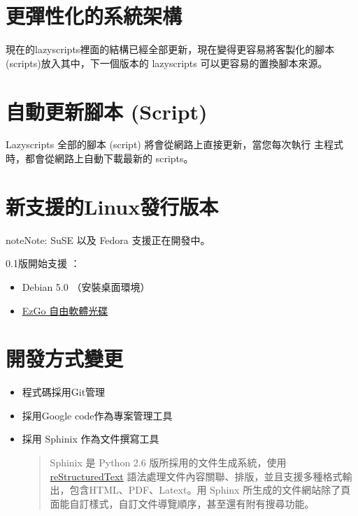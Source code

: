 \documentclass[letterpaper,10pt,english]{manual}
\begin{document}
\section{更彈性化的系統架構}

現在的lazyscripts裡面的結構已經全部更新，現在變得更容易將客製化的腳本
(scripts)放入其中，下一個版本的 lazyscripts 可以更容易的置換腳本來源。


\section{自動更新腳本 (Script)}

Lazyscripts 全部的腳本 (script) 將會從網路上直接更新，當您每次執行
主程式時，都會從網路上自動下載最新的 scripts。


\section{新支援的Linux發行版本}

\begin{notice}{note}{Note:}
SuSE 以及 Fedora 支援正在開發中。
\end{notice}

0.1版開始支援 ：
\begin{itemize}
\item {} 
Debian 5.0 （安裝桌面環境）

\item {} 
\href{http://news.ossacc.org/new\_icare\_readme\_linux/ezgo.html}{EzGo 自由軟體光碟}

\end{itemize}


\section{開發方式變更}
\begin{itemize}
\item {} 
程式碼採用Git管理

\item {} 
採用Google code作為專案管理工具

\item {} 
採用 Sphinix 作為文件撰寫工具
\begin{quote}

Sphinix 是 Python 2.6 版所採用的文件生成系統，使用 \href{http://docutils.sourceforge.net/rst.html}{reStructuredText}
語法處理文件內容關聯、排版，並且支援多種格式輸出，包含HTML、PDF、Latext。用 Sphinx 所生成的文件網站除了頁面能自訂樣式，自訂文件導覽順序，甚至還有附有搜尋功能。
\end{quote}

\end{itemize}
\end{document}
